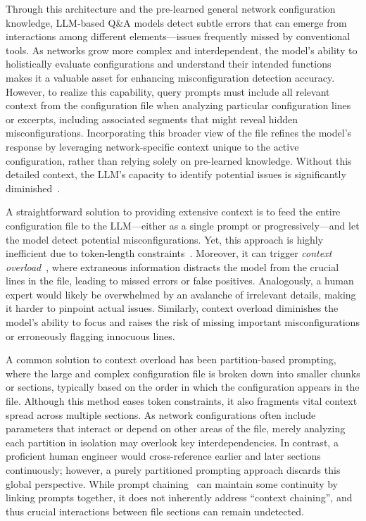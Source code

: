 Through this architecture and the pre-learned general network configuration
knowledge, LLM-based Q\&A models detect subtle errors that can emerge from
interactions among different elements—issues frequently missed by conventional
tools. As networks grow more complex and interdependent, the model’s ability to
holistically evaluate configurations and understand their intended functions
makes it a valuable asset for enhancing misconfiguration detection accuracy.
However, to realize this capability, query prompts must include all relevant
context from the configuration file when analyzing particular configuration lines
or excerpts, including associated segments that might reveal hidden
misconfigurations. Incorporating this broader view of the file refines the
model’s response by leveraging network-specific context unique to the active
configuration, rather than relying solely on pre-learned knowledge. Without
this detailed context, the LLM’s capacity to identify potential issues is
significantly diminished~\cite{liskavets2024prompt,tian2024examining,khurana2024and,
	shvartzshnaider2024llm}.

A straightforward solution to providing extensive context is to feed the entire
configuration file to the LLM—either as a single prompt or progressively—and let
the model detect potential misconfigurations. Yet, this approach is highly inefficient
due to token-length constraints~\cite{xue2024repeat,yu2024breaking,gu2023mamba}.
Moreover, it can trigger \emph{context overload}~\cite{lican,li2024long,qian2024long},
where extraneous information distracts the model from the crucial lines in the file,
leading to missed errors or false positives. Analogously, a human expert would likely
be overwhelmed by an avalanche of irrelevant details, making it harder to pinpoint
actual issues. Similarly, context overload diminishes the model’s ability to focus
and raises the risk of missing important misconfigurations or erroneously flagging
innocuous lines.

A common solution to context overload has been partition-based prompting,
where the large and complex configuration file is broken down into smaller
chunks or sections, typically based on the order in which the configuration
appears in the file. 
 Although this method eases token constraints, it also fragments
vital context spread across multiple sections. As network configurations often include
parameters that interact or depend on other areas of the file, merely analyzing each
partition in isolation may overlook key interdependencies. In contrast, a proficient
human engineer would cross-reference earlier and later sections continuously; however,
a purely partitioned prompting approach discards this global perspective. While prompt
chaining~\cite{wang2024identifying,bogdanov2024leveraging} can maintain some continuity
by linking prompts together, it does not inherently address “context chaining”, and
thus crucial interactions between file sections can remain undetected.

